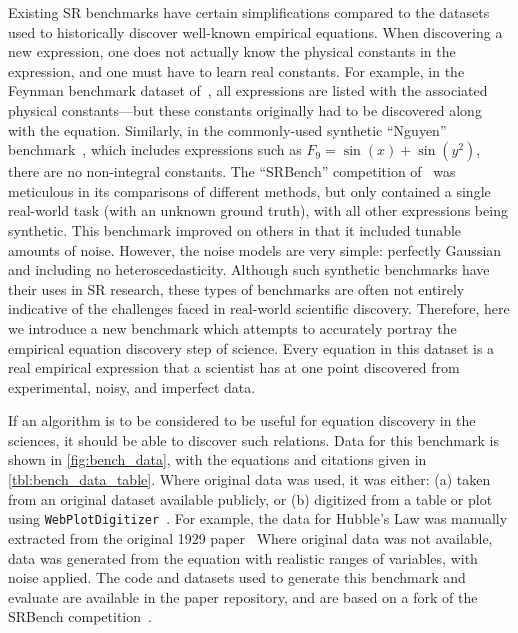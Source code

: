 \documentclass[letterpaper,twocolumn]{scrartcl}
\begin{document}
\begin{linenumbers}
Existing SR benchmarks have certain simplifications compared to the datasets used to historically discover well-known empirical equations.
When discovering a new expression, one does not actually know the physical constants in the expression, and one must have to learn real constants.
For example, in the Feynman benchmark dataset of~\cite{udrescuAIFeynmanPhysicsinspired2020}, all expressions are listed with the associated physical constants---but these constants originally had to be discovered along with the equation.
Similarly, in the commonly-used synthetic ``Nguyen'' benchmark~\cite{nguyenquanguySemanticallybasedCrossoverGenetic2011}, which includes expressions such as $F_9=\sin(x)+\sin(y^2)$, there are no non-integral constants.
The ``SRBench'' competition of~\cite{defrancaInterpretableSymbolicRegression2023} was meticulous in its comparisons of different methods, but only contained a single real-world task (with an unknown ground truth), with all other expressions being synthetic.
This benchmark improved on others in that it included tunable amounts of noise.
However, the noise models are very simple: perfectly Gaussian and including no heteroscedasticity.
Although such synthetic benchmarks have their uses in SR research, these types of benchmarks are often not entirely indicative of the challenges faced in real-world scientific discovery.
Therefore, here we introduce a new benchmark which attempts to accurately portray the empirical equation discovery step of science.
Every equation in this dataset is a real empirical expression that a scientist has at one point discovered from experimental, noisy, and imperfect data.

If an algorithm is to be considered to be useful for equation discovery in the sciences, it should be able to discover such relations.
Data for this benchmark is shown in \cref{fig:bench_data}, with the equations and
citations given in \cref{tbl:bench_data_table}.
Where original data was used, it was either: (a) taken from an original dataset available publicly, or (b) digitized from a table or plot using \texttt{WebPlotDigitizer}~\cite{rohatgiWebplotdigitizerVersion2022}.
For example, the data for Hubble's Law was manually extracted from the original 1929 paper~\citep[][]{hubbleRelationDistanceRadial1929}
Where original data was not available, data was generated from the equation with realistic ranges of variables, with noise applied.
The code and datasets used to generate this benchmark and evaluate are available in the paper repository, and are based on a fork of the SRBench competition~\cite{lacavaContemporarySymbolicRegression2021,defrancaInterpretableSymbolicRegression2023}.



\end{linenumbers}
\end{document}
